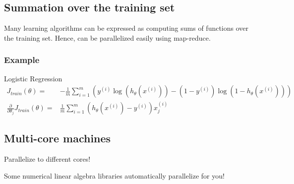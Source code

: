 \subsection{Summation over the training set}
Many learning algorithms can be expressed as computing sums of functions
over the training set. Hence, can be parallelized easily using map-reduce.

\subsubsection{Example}
Logistic Regression
\begin{align*}
	J_{train}(\theta) ={}                                  &
	-\frac{1}{m}\sum_{i=1}^m\left(
	y^{(i)}\log(h_\theta(x^{(i)})) - (1 - y^{(i)})\log(1 - h_\theta(x^{(i)}))
	\right)                                                  \\
	\frac{\partial}{\partial\theta_j}J_{train}(\theta) ={} &
	\frac{1}{m}\sum_{i=1}^m\left(
	h_\theta(x^{(i)}) - y^{(i)}
	\right)x_j^{(i)}
\end{align*}

\subsection{Multi-core machines}
Parallelize to different cores!

\begin{remark}
	Some numerical linear algebra libraries automatically parallelize for you!
\end{remark}

